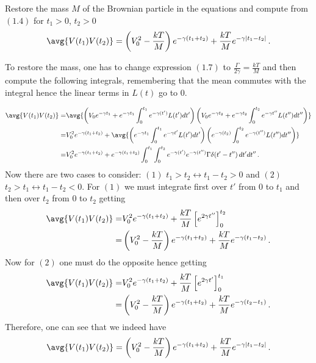 

Restore the mass $M$ of the Brownian particle in the equations and compute from $(1.4)$ for $t_1 > 0$, $t_2 > 0$
\begin{equation*}
\avg{V(t_1)V(t_2)} = \left( V_0^2 - \frac{kT}{M} \right) e^{-\gamma (t_1 + t_2)} + \frac{kT}{M} e^{-\gamma |t_1-t_2|} \, .
\end{equation*}



To restore the mass, one has to change expression $(1.7)$ to $\frac{\Gamma}{2\gamma}=\frac{kT}{M}$ and then compute the following integrals, remembering that the mean commutes with the integral hence the linear terms in $L(t)$ go to $0$.

\begin{align*}
\avg{V(t_1)V(t_2)} =& \avg{
\left( V_0 e^{-\gamma t_1}+ e^{-\gamma t_1} \int_0^{t_1} e^{-\gamma (t')}L(t')dt' \right) 
\left( V_0 e^{-\gamma t_2} + e^{-\gamma t_2} \int_0^{t_2} e^{-\gamma t''} L(t'')dt'' \right) } \\
= & V_0^2 e^{-\gamma (t_1 + t_2)} + \avg{ \left( e^{-\gamma t_1} \int_0^{t_1} e^{-\gamma t'} L(t')dt' \right) \left( e^{-\gamma (t_2)} \int_0^{t_2} e^{-\gamma (t'')} L(t'')dt'' \right) } \\
= & V_0^2 e^{-\gamma (t_1+t_2)} + e^{-\gamma (t_1+t_2)} \int_0^{t_1} \int_0^{t_2} e^{-\gamma (t')} e^{-\gamma (t'')} \Gamma \delta(t'-t'') \, dt'dt'' \, .
\end{align*}
Now there are two cases to consider: $(1)$ $t_1>t_2 \leftrightarrow t_1-t_2>0$ and $(2)$ $t_2>t_1 \leftrightarrow t_1-t_2<0$.
For $(1)$ we must integrate first over $t'$ from $0$ to $t_1$ and then over $t_2$ from $0$ to $t_2$ getting
\begin{align*}
\avg{ V(t_1)V(t_2) } =& V_0^2 e^{-\gamma (t_1+t_2)} + \frac{kT}{M} \left[ e^{2\gamma t''} \right]_0^{t_2} \\
=& \left( V_0^2 - \frac{kT}{M} \right) e^{-\gamma (t_1+t_2)} + \frac{kT}{M} e^{-\gamma (t_1-t_2)} \, .
\end{align*}
Now for $(2)$ one must do the opposite hence getting
\begin{align*}
\avg{V(t_1)V(t_2)}
=& V_0^2 e^{-\gamma (t_1+t_2)} + \frac{kT}{M} \left[ e^{2\gamma t'} \right]_0^{t_1} \\
=& \left( V_0^2 - \frac{kT}{M} \right) e^{-\gamma (t_1+t_2)} + \frac{kT}{M} e^{-\gamma (t_2-t_1)} \, .
\end{align*}
Therefore, one can see that we indeed have
\begin{equation*}
\avg{ V(t_1)V(t_2) } = \left( V_0^2 - \frac{kT}{M} \right) e^{-\gamma (t_1 + t_2)} + \frac{kT}{M} e^{-\gamma |t_1-t_2|} \, .
\end{equation*}
